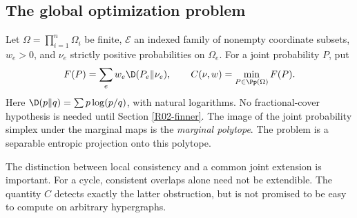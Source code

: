 \documentclass[11pt,a4paper]{article}
\theoremstyle{definition}\newtheorem{definition}[theorem]{Definition}
\theoremstyle{remark}\newtheorem{remark}[theorem]{Remark}
\numberwithin{equation}{section}
\begin{document}
\subsection{The global optimization problem}\label{R02-sec-1}
Let $\Omega=\prod_{i=1}^n\Omega_i$ be finite, $\mathcal E$ an indexed family of nonempty coordinate subsets, $w_e>0$, and $\nu_e$ strictly positive probabilities on $\Omega_e$. For a joint probability $P$, put
\[
F(P)=\sum_e w_e\D(P_e\Vert\nu_e),\qquad
C(\nu,w)=\min_{P\in\Pp(\Omega)}F(P).
\]
Here $\D(p\Vert q)=\sum p\log(p/q)$, with natural logarithms. No fractional-cover hypothesis is needed until Section \ref{R02-finner}. The image of the joint probability simplex under the marginal maps is the \emph{marginal polytope}. The problem is a separable entropic projection onto this polytope.

The distinction between local consistency and a common joint extension is important. For a cycle, consistent overlaps alone need not be extendible. The quantity $C$ detects exactly the latter obstruction, but is not promised to be easy to compute on arbitrary hypergraphs.
\end{document}
